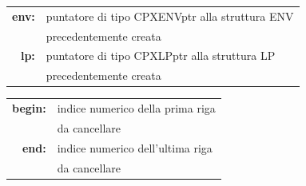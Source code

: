 \begin{table}[h]
\centering
\begin{tabular}{rl}
\textbf{env:} & {puntatore di tipo CPXENVptr alla struttura ENV}\\
& {precedentemente creata}\\
\textbf{lp:} & {puntatore di tipo CPXLPptr alla struttura LP}\\
& {precedentemente creata}\\
\end{tabular}
\end{table}
\begin{table}[h]
\centering
\begin{tabular}{rl}
\textbf{begin:} & {indice numerico della prima riga}\\
& {da cancellare}\\
\textbf{end:} & {indice numerico dell'ultima riga}\\
& {da cancellare}\\
\end{tabular}
\end{table}
\vspace{6cm} 
